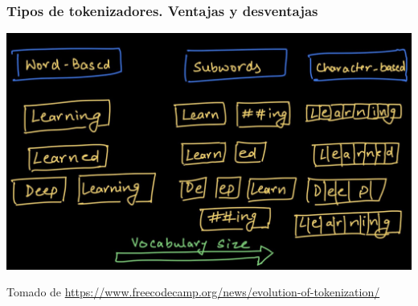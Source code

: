 \documentclass[
10pt, %
aspectratio=169, %
]{beamer}
\begin{document}
	
	\begin{frame}
		
		\frametitle{Tipos de tokenizadores. Ventajas y desventajas}
		
		\centering
		\includegraphics[scale=0.34]{tipo-tokenizador.png} 
		
		{\scriptsize Tomado de \url{https://www.freecodecamp.org/news/evolution-of-tokenization/}}
		
		
		
		
	\end{frame}
	
	
\end{document}
